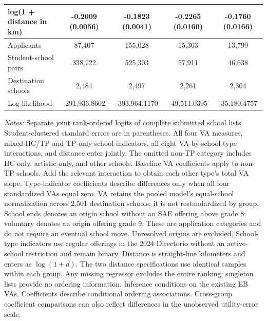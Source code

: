 \begin{table}[!htbp]
{\begin{tabular}{lcccc}
log(1 + distance in km) & -0.2009 (0.0056) & -0.1823 (0.0041) & -0.2265 (0.0160) & -0.1760 (0.0166) \\
\midrule
Applicants & 87,407 & 155,028 & 15,363 & 13,799 \\
Student-school pairs & 338,722 & 525,303 & 57,911 & 46,638 \\
Destination schools & 2,484 & 2,497 & 2,261 & 2,304 \\
Log likelihood & -291,936.8602 & -393,964.1170 & -49,511.0395 & -35,180.4757 \\
\bottomrule
\end{tabular}
}
\par\smallskip
\begin{minipage}{0.98\linewidth}\footnotesize
\textit{Notes:} Separate joint rank-ordered logits of complete submitted school lists. Student-clustered standard errors are in parentheses. All four VA measures, mixed HC/TP and TP-only school indicators, all eight VA-by-school-type interactions, and distance enter jointly. The omitted non-TP category includes HC-only, artistic-only, and other schools. Baseline VA coefficients apply to non-TP schools. Add the relevant interaction to obtain each other type's total VA slope. Type-indicator coefficients describe differences only when all four standardized VAs equal zero. VA retains the pooled model's equal-school normalization across 2,501 destination schools; it is not restandardized by group. School ends denotes an origin school without an SAE offering above grade 8; voluntary denotes an origin offering grade 9. These are application categories and do not require an eventual school move. Unresolved origins are excluded. School-type indicators use regular offerings in the 2024 Directorio without an active-school restriction and remain binary. Distance is straight-line kilometers and enters as $\log(1+d)$. The two distance specifications use identical samples within each group. Any missing regressor excludes the entire ranking; singleton lists provide no ordering information. Inference conditions on the existing EB VAs. Coefficients describe conditional ordering associations. Cross-group coefficient comparisons can also reflect differences in the unobserved utility-error scale.
\end{minipage}
\end{table}

